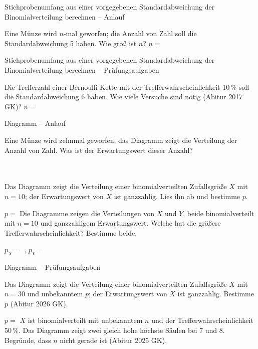 \begin{aufgabe}{Stichprobenumfang aus einer vorgegebenen Standardabweichung der Binomialverteilung berechnen – Anlauf}
\begin{teile}
\teil Eine Münze wird $n$-mal geworfen; die Anzahl von Zahl soll die Standardabweichung 5 haben. Wie groß ist $n$? $n = $ \leerfeld
\end{teile}
\end{aufgabe}

\begin{aufgabe}{Stichprobenumfang aus einer vorgegebenen Standardabweichung der Binomialverteilung berechnen – Prüfungsaufgaben}
\begin{teile}
\teil Die Trefferzahl einer Bernoulli-Kette mit der Trefferwahrscheinlichkeit 10\,\% soll die Standardabweichung 6 haben. Wie viele Versuche sind nötig \hfill (Abitur 2017 GK)? $n = $ \leerfeld
\end{teile}
\end{aufgabe}

\begin{aufgabe}{Diagramm – Anlauf}
\begin{teile}
\teil Eine Münze wird zehnmal geworfen; das Diagramm zeigt die Verteilung der Anzahl von Zahl. Was ist der Erwartungswert dieser Anzahl? \\  \\  \\ 

\teil Das Diagramm zeigt die Verteilung einer binomialverteilten Zufallsgröße $X$ mit $n = 10$; der Erwartungswert von $X$ ist ganzzahlig. Lies ihn ab und bestimme $p$.

$p = $ \leerfeld
\teil Die Diagramme zeigen die Verteilungen von $X$ und $Y$, beide binomialverteilt mit $n = 10$ und ganzzahligem Erwartungswert. Welche hat die größere Trefferwahrscheinlichkeit? Bestimme beide.

 
$p_X = $ \leerfeld , $p_Y = $ \leerfeld
\end{teile}
\end{aufgabe}

\begin{aufgabe}{Diagramm – Prüfungsaufgaben}
\begin{teile}
\teil Das Diagramm zeigt die Verteilung einer binomialverteilten Zufallsgröße $X$ mit $n = 30$ und unbekanntem $p$; der Erwartungswert von $X$ ist ganzzahlig. Bestimme $p$ \hfill (Abitur 2026 GK).

$p = $ \leerfeld
\teil $X$ ist binomialverteilt mit unbekanntem $n$ und der Trefferwahrscheinlichkeit 50\,\%. Das Diagramm zeigt zwei gleich hohe höchste Säulen bei 7 und 8. Begründe, dass $n$ nicht gerade ist \hfill (Abitur 2025 GK).

\end{teile}
\end{aufgabe}
